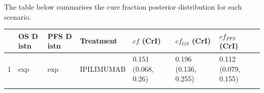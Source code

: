 \documentclass[
]{article}
\begin{document}
The table below summarises the cure fraction posterior distribution for
each scenario.

\begin{longtable}[]{@{}lllllll@{}}
\toprule
\begin{minipage}[b]{0.04\columnwidth}\raggedright
\strut
\end{minipage} & \begin{minipage}[b]{0.08\columnwidth}\raggedright
OS D istn\strut
\end{minipage} & \begin{minipage}[b]{0.08\columnwidth}\raggedright
PFS D istn\strut
\end{minipage} & \begin{minipage}[b]{0.15\columnwidth}\raggedright
Treatment\strut
\end{minipage} & \begin{minipage}[b]{0.15\columnwidth}\raggedright
\(cf\) (CrI)\strut
\end{minipage} & \begin{minipage}[b]{0.15\columnwidth}\raggedright
\(cf_{OS}\) (CrI)\strut
\end{minipage} & \begin{minipage}[b]{0.16\columnwidth}\raggedright
\(cf_{PFS}\) (CrI)\strut
\end{minipage}\tabularnewline
\midrule
\endhead
\begin{minipage}[t]{0.04\columnwidth}\raggedright
1\strut
\end{minipage} & \begin{minipage}[t]{0.08\columnwidth}\raggedright
exp\strut
\end{minipage} & \begin{minipage}[t]{0.08\columnwidth}\raggedright
exp\strut
\end{minipage} & \begin{minipage}[t]{0.15\columnwidth}\raggedright
IPILIMUMAB\strut
\end{minipage} & \begin{minipage}[t]{0.15\columnwidth}\raggedright
0.151 (0.068, 0.26)\strut
\end{minipage} & \begin{minipage}[t]{0.15\columnwidth}\raggedright
0.196 (0.136, 0.255)\strut
\end{minipage} & \begin{minipage}[t]{0.16\columnwidth}\raggedright
0.112 (0.079, 0.155)\strut
\end{minipage}\tabularnewline
\begin{minipage}[t]{0.04\columnwidth}\raggedright

\end{minipage}
\end{longtable}
\end{document}
